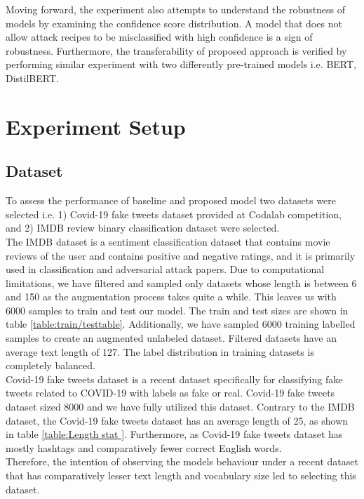 \documentclass[%
	BCOR=8mm, %
	DIV=12,
	toc=bibliography, %
	toc=listof, %
	oneside, %
	egregdoesnotlikesansseriftitles, %
	]{scrbook}
\begin{document}
Moving forward, the experiment also attempts to understand the robustness of models by examining the confidence score distribution. A model that does not allow attack recipes to be misclassified with high confidence is a sign of robustness. Furthermore, the transferability of proposed approach is verified by performing similar experiment with two differently pre-trained models i.e. BERT, DistilBERT.
 
\chapter{Experiment Setup}
\label{chapter:experiment}

\section{Dataset}
\label{label:dataset}
To assess the performance of baseline and proposed model two datasets were selected i.e. 1) Covid-19  fake tweets dataset \cite{patwa_fighting_2021} provided at Codalab competition, and 2) IMDB review binary classification dataset were selected. \\
The IMDB dataset is a sentiment classification dataset \cite{maas_learning_2011-1} that contains movie reviews of the user and contains positive and negative ratings, and it is primarily used in classification and adversarial attack papers. Due to computational limitations, we have filtered and sampled only datasets whose length is between 6 and 150 as the augmentation process takes quite a while. This leaves us with 6000 samples to train and test our model. The train and test sizes are shown in table \ref{table:train/testtable}. Additionally, we have sampled 6000 training labelled samples to create an augmented unlabeled dataset. Filtered datasets have an average text length of 127. The label distribution in training datasets is completely balanced.\\
Covid-19 fake tweets dataset is a recent dataset specifically for classifying fake tweets related to COVID-19 with labels as fake or real. Covid-19 fake tweets dataset sized 8000 and we have fully utilized this dataset. Contrary to the IMDB dataset, the Covid-19  fake tweets dataset has an average length of 25, as shown in table \ref{table:Length stat }. Furthermore, as Covid-19  fake tweets dataset has mostly hashtags and comparatively fewer correct English words.\\
Therefore, the intention of observing the models behaviour under a recent dataset that has comparatively lesser text length and vocabulary size led to selecting this dataset.
\end{document}
